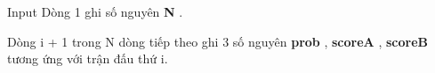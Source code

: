 Input
Dòng 1 ghi số nguyên \textbf{ N } .

Dòng i + 1 trong N dòng tiếp theo ghi 3 số nguyên \textbf{ prob } , \textbf{ scoreA } , \textbf{ scoreB } tương ứng với trận đấu thứ i.